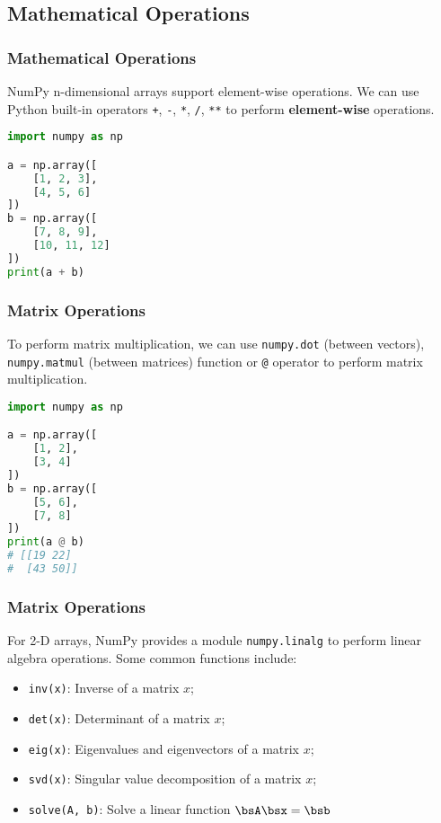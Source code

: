\documentclass[beamer, en, version=2.0]{huangfusl-template}
\begin{document}
    \subsection{Mathematical Operations}
    \begin{frame}[fragile]
        \frametitle{Mathematical Operations}

        NumPy n-dimensional arrays support element-wise operations. We can use Python built-in operators {\color{blue}\footnotesize\verb|+|}, {\color{blue}\footnotesize\verb|-|}, {\color{blue}\footnotesize\verb|*|}, {\color{blue}\footnotesize\verb|/|}, {\color{blue}\footnotesize\verb|**|} to perform \textbf{element-wise} operations.

\begin{lstlisting}[language=python]
import numpy as np

a = np.array([
    [1, 2, 3],
    [4, 5, 6]
])
b = np.array([
    [7, 8, 9],
    [10, 11, 12]
])
print(a + b)
\end{lstlisting}
    \end{frame}
    \begin{frame}[fragile]
        \frametitle{Matrix Operations}

        To perform matrix multiplication, we can use {\color{blue}\footnotesize\verb|numpy.dot|} (between vectors), {\color{blue}\footnotesize\verb|numpy.matmul|} (between matrices) function or  {\color{blue}\footnotesize\verb|@|} operator to perform matrix multiplication.

\begin{lstlisting}[language=python]
import numpy as np

a = np.array([
    [1, 2],
    [3, 4]
])
b = np.array([
    [5, 6],
    [7, 8]
])
print(a @ b)
# [[19 22]
#  [43 50]]
\end{lstlisting}
    \end{frame}
    \begin{frame}[fragile]
        \frametitle{Matrix Operations}

        For 2-D arrays, NumPy provides a module {\color{blue}\footnotesize\verb|numpy.linalg|} to perform linear algebra operations. Some common functions include:

        \begin{itemize}
            \item {\color{blue}\footnotesize\verb|inv(x)|:} Inverse of a matrix $x$;
            \item {\color{blue}\footnotesize\verb|det(x)|:} Determinant of a matrix $x$;
            \item {\color{blue}\footnotesize\verb|eig(x)|:} Eigenvalues and eigenvectors of a matrix $x$;
            \item {\color{blue}\footnotesize\verb|svd(x)|:} Singular value decomposition of a matrix $x$;
            \item {\color{blue}\footnotesize\verb|solve(A, b)|:} Solve a linear function $\bsA\bsx = \bsb$
        \end{itemize}
    \end{frame}
\end{document}
